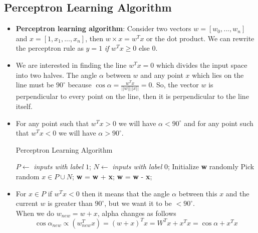 \documentclass[a4paper]{article}
\begin{document}
\subsection{Perceptron Learning Algorithm}
\begin{itemize}
    \item \textbf{Perceptron learning algorithm}: Consider two vectors $w=[w_0,...,w_n]$ and $x=[1,x_1,...,x_n]$, then $w\times x=w^Tx$ or the dot product. We can rewrite the perceptron rule as $y=1$ \textit{if} $w^Tx\geq 0$ else $0$.\\
    \item We are interested in finding the line $w^Tx=0$ which divides the input space into two halves. The angle $\alpha$ between $w$ and any point $x$ which lies on the line must be $90^{\circ}$ because $\cos{\alpha}=\frac{w^Tx}{||w||||x||}=0$. So, the vector $w$ is perpendicular to every point on the line, then it is perpendicular to the line itself.
    \item For any point such that $w^Tx>0$ we will have $\alpha<90^{\circ}$ and for any point such that $w^Tx<0$ we will have $\alpha>90^{\circ}$.
    \begin{algorithm}[H]
        \caption{Perceptron Learning Algorithm}\label{alg:DL-perceptron-learning-alg}
        \begin{algorithmic}[1]
            \State $P\gets$ \textit{inputs with label }$1$;
            \State $N\gets$ \textit{inputs with label }$0$;
            \State Initialize \textbf{w} randomly
                \State Pick random $x\in P\cup N$;
                    \State \textbf{w} = \textbf{w} + \textbf{x};
                \EndIf
                    \State \textbf{w} = \textbf{w} - \textbf{x};
                \EndIf
            \EndWhile
        \end{algorithmic}
    \end{algorithm}
    \item For $x\in P$ if $w^Tx<0$ then it means that the angle $\alpha$ between this $x$ and the current $w$ is greater than $90^{\circ}$, but we want it to be $<90^{\circ}$.\\
    When we do $w_{new}=w+x$, alpha changes as follows
    \begin{equation*}
        \cos{\alpha_{new}}\propto (w_{new}^Tx)=(w+x)^Tx=W^Tx+x^Tx=\cos{\alpha}+x^Tx

\end{equation*}
\end{itemize}
\end{document}
